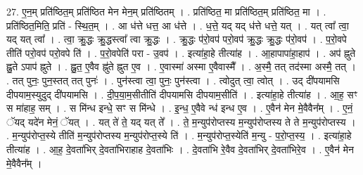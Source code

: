 \documentclass[17pt]{extarticle}
\begin{document}
27. ए॒न॒म् प्रति॑ष्ठित॒म् प्रति॑ष्ठित मेन मेन॒म् प्रति॑ष्ठितम् । . प्रति॑ष्ठित॒ मा प्रति॑ष्ठित॒म् प्रति॑ष्ठित॒ मा । . प्रति॑ष्ठित॒मिति॒ प्रति॑ - स्थि॒त॒म् । . आ ध॑त्ते धत्त॒ आ ध॑त्ते । . ध॒त्ते॒ यद् यद् ध॑त्ते धत्ते॒ यत् । . यत् त्वा᳚ त्वा॒ यद् यत् त्वा᳚ । . त्वा॒ क्रु॒द्धः क्रु॒द्धस्त्वा᳚ त्वा क्रु॒द्धः । . क्रु॒द्धः प॑रो॒वप॑ परो॒वप॑ क्रु॒द्धः क्रु॒द्धः प॑रो॒वप॑ । . प॒रो॒वपे तीति॑ परो॒वप॑ परो॒वपे ति॑ । . प॒रो॒वपेति॑ परा - उ॒वप॑ । . इत्या॑हा॒हे तीत्या॑ह । . आ॒हापापा॑हा॒हाप॑ । . अप॑ ह्नुते ह्नु॒ते ऽपाप॑ ह्नुते । . ह्नु॒त॒ ए॒वैव ह्नु॑ते ह्नुत ए॒व । . ए॒वास्मा॑ अस्मा ए॒वैवास्मै᳚ । . अ॒स्मै॒ तत् तद॑स्मा अस्मै॒ तत् । . तत् पुनः॒ पुन॒स्तत् तत् पुनः॑ । . पुन॑स्त्वा त्वा॒ पुनः॒ पुन॑स्त्वा । . त्वोदुत् त्वा॒ त्वोत् । . उद् दी॑पयामसि दीपयाम॒स्युदुद् दी॑पयामसि । . दी॒प॒या॒म॒सीतीति॑ दीपयामसि दीपयाम॒सीति॑ । . इत्या॑हा॒हे तीत्या॑ह । . आ॒ह॒ सꣳ स मा॑हाह॒ सम् । . स मि॑न्ध इन्धे॒ सꣳ स मि॑न्धे । . इ॒न्ध॒ ए॒वैवे न्ध॑ इन्ध ए॒व । . ए॒वैन॑ मेन मे॒वैवैन᳚म् । . ए॒नं॒ ॅयद् यदे॑न मेनं॒ ॅयत् । . यत् ते॑ ते॒ यद् यत् ते᳚ । . ते॒ म॒न्युप॑रोप्तस्य म॒न्युप॑रोप्तस्य ते ते म॒न्युप॑रोप्तस्य । . म॒न्युप॑रोप्त॒स्ये तीति॑ म॒न्युप॑रोप्तस्य म॒न्युप॑रोप्त॒स्ये ति॑ । . म॒न्युप॑रोप्त॒स्येति॑ म॒न्यु - प॒रो॒प्त॒स्य॒ । . इत्या॑हा॒हे तीत्या॑ह । . आ॒ह॒ दे॒वता॑भिर् दे॒वता॑भिराहाह दे॒वता॑भिः । . दे॒वता॑भि रे॒वैव दे॒वता॑भिर् दे॒वता॑भिरे॒व । . ए॒वैन॑ मेन मे॒वैवैन᳚म् । \newline
\end{document}
